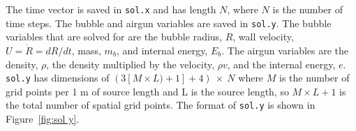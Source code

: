 \documentclass[10pt]{article}
\begin{document}
The time vector is saved in \texttt{sol.x} and has length $N$, where $N$ is the number of time steps. The bubble and airgun variables are saved in \texttt{sol.y}. The bubble variables that are solved for are the bubble radius, $R$, wall velocity, $U = \dot{R} = dR/dt$, mass, $m_b$, and internal energy, $E_b$. The airgun variables are the density, $\rho$, the density multiplied by the velocity, $\rho v$, and the internal energy, $e$. \texttt{sol.y} has dimensions of $(3[M \times L)+1] + 4)~\times~N$ where $M$ is the number of grid points per 1 m of source length and L is the source length, so $M\times L+1$ is the total number of spatial grid points. The format of \texttt{sol.y} is shown in Figure~\ref{fig:sol y}.











\newpage


\end{document}
